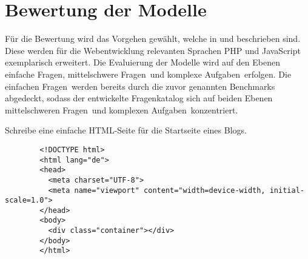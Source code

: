 


\section{Bewertung der Modelle}
Für die Bewertung wird das Vorgehen gewählt, welche in \cite{chen-2021} und \cite{peng-2024} beschrieben sind. Diese werden für die Webentwicklung relevanten Sprachen PHP und JavaScript exemplarisch erweitert. Die Evaluierung der Modelle wird auf den Ebenen \glqq einfache Fragen\grqq , \glqq mittelschwere Fragen\grqq \ und \glqq komplexe Aufgaben\grqq \ erfolgen. Die \glqq einfachen Fragen\grqq \ werden bereits durch die zuvor genannten Benchmarks abgedeckt, sodass der entwickelte Fragenkatalog sich auf beiden Ebenen \glqq mittelschweren Fragen\grqq \ und \glqq komplexen Aufgaben\grqq \ konzentriert.\vspace{0.2cm}


\begin{tcolorbox}[
	enhanced,
	colback=BhtColorYellow!5!white,
	colframe=BhtColorYellow!75!black,
	title= HTML Startseite
	]
	Schreibe eine einfache HTML-Seite für die Startseite eines Blogs.
\end{tcolorbox}

\begin{tcolorbox}[
	enhanced,
	colback=BhtGrey!5!white,
	colframe=BhtGrey!75!black!50,
	title= ChatGPT 3.5
	]
	\begin{verbatim}
		<!DOCTYPE html>
		<html lang="de">
		<head>
		  <meta charset="UTF-8">
		  <meta name="viewport" content="width=device-width, initial-scale=1.0">
		</head>
		<body>
		  <div class="container"></div>
		</body>
		</html>
	\end{verbatim}
\end{tcolorbox}
